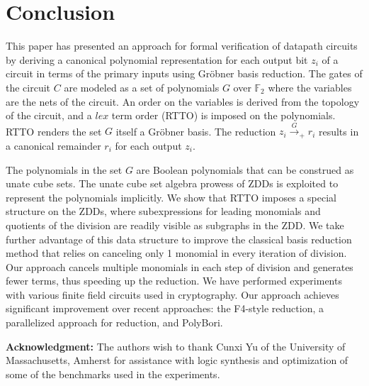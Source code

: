 \section{Conclusion} \label{sec:conc}
This paper has presented an approach for formal verification of 
datapath circuits by deriving a canonical polynomial representation
for each output bit $z_i$ of a circuit in terms of the primary inputs
using Gr\"obner basis reduction. The gates of the circuit $C$ are
modeled as a set of polynomials $G$ over $\mathbb{F}_2$ where the
variables are the nets of the circuit. An order on the variables is
derived from the topology of the circuit, and a $lex$ term order
(RTTO) is imposed on the polynomials. RTTO renders the set $G$ itself a
Gr\"obner basis. The reduction $z_i\xrightarrow{G}_+ r_i$
results in a canonical remainder $r_i$ for  each output $z_i$. 
\par The polynomials in the set $G$ are Boolean polynomials that can 
be construed as unate cube sets. The unate cube set algebra prowess of
ZDDs is exploited to represent the polynomials implicitly. We show
that RTTO imposes a special structure on the ZDDs, where
subexpressions for leading monomials and quotients of the division are
readily visible as subgraphs in the ZDD. We take further advantage of
this data structure to improve the classical \Grobner basis reduction 
method that relies on canceling only 1 monomial in every iteration
of division. Our approach cancels multiple monomials in each step of
division and generates fewer terms, thus speeding up the reduction. 
We have performed experiments with various finite field circuits used in
cryptography. Our approach achieves significant improvement over
recent approaches: the F4-style reduction, a parallelized approach for
reduction, and PolyBori. 

\par \textbf{Acknowledgment:} The authors wish to thank Cunxi Yu of
the University of Massachusetts, Amherst for assistance with
logic synthesis and optimization of some of the benchmarks used in the
experiments.  

